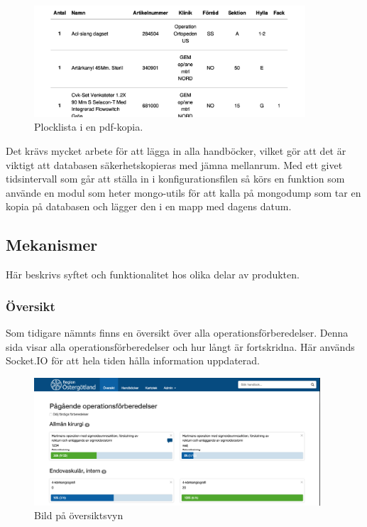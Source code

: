 \begin{figure}
  \centering
  \includegraphics[width=0.9\textwidth]{images/pdf-end.png}
  \caption{Plocklista i en pdf-kopia.}
  \label{fig:pdf-end}
\end{figure}

Det krävs mycket arbete för att lägga in alla handböcker, vilket gör att det är viktigt att databasen säkerhetskopieras med jämna mellanrum. Med ett givet tidsintervall som går att ställa in i konfigurationsfilen så körs en funktion som använde en modul som heter mongo-utils för att kalla på mongodump som tar en kopia på databasen och lägger den i en mapp med dagens datum. 
\subsection{Mekanismer}
Här beskrivs syftet och funktionalitet hos olika delar av produkten.

\subsubsection{Översikt}
Som tidigare nämnts finns en översikt över alla operationsförberedelser.
Denna sida visar alla operationsförberedelser och hur långt är fortskridna.
Här används Socket.IO för att hela tiden hålla information uppdaterad.

\begin{figure}[h!]
  \centering
  \includegraphics[width=0.95\textwidth]{images/site/overview.png}
  \caption{Bild på översiktsvyn}
  \label{fig:siteoverview}
\end{figure}

